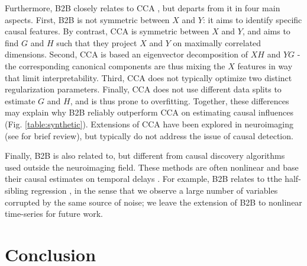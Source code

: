\documentclass{article}
\begin{document}
Furthermore, B2B closely relates to CCA \citep{cca_hotelling}, but departs from it in four main aspects. First, B2B is not symmetric between $X$ and $Y$: it aims to identify specific causal features. By contrast, CCA is symmetric between $X$ and $Y$, and aims to find $G$ and $H$ such that they project $X$ and $Y$ on maximally correlated dimensions. Second, CCA is based an eigenvector decomposition of $XH$ and $YG$ - the corresponding canonical components are thus mixing the $X$ features in way that limit interpretability. Third, CCA does not typically optimize two distinct regularization parameters. Finally, CCA does not use different data splits to estimate $G$ and $H$, and is thus prone to overfitting. Together, these differences may explain why B2B reliably outperform CCA on estimating causal influences (Fig. \ref{table:synthetic}). Extensions of CCA have been explored in neuroimaging (see \citep{de2019multiway} for brief review), but typically do not address the issue of causal detection.

Finally, B2B is also related to, but different from causal discovery algorithms used outside the neuroimaging field. These methods are often nonlinear \citep{peters2017elements} and base their causal estimates on temporal delays \citep{granger1969investigating, janzing2013quantifying}. For example, B2B relates to tthe half-sibling regression \citep{scholkopf2016modeling}, in the sense that we observe a large number of variables corrupted by the same source of noise; we leave the extension of B2B to nonlinear time-series for future work.


\section{Conclusion}


\clearpage
\newpage




% 

%


\end{document}
